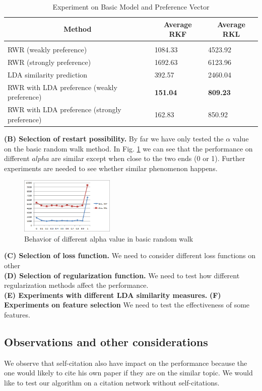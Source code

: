 \documentclass{article} %
\begin{document}
\begin{table}[t]
\caption{Experiment on Basic Model and Preference Vector}
\label{results-table}
\begin{center}
\begin{tabular}{lll}
\multicolumn{1}{c}{\bf Method}  &\multicolumn{1}{c}{\bf Average RKF} &\multicolumn{1}{c}{\bf Average RKL}
\\ \hline \\
RWR (weakly preference) &1084.33 &4523.92\\
RWR (strongly preference) &1692.63 &6123.96\\
LDA similarity prediction &392.57 &2460.04\\
RWR with LDA preference (weakly preference) &\textbf{151.04} &\textbf{809.23}\\
RWR with LDA preference (strongly preference) &162.83 &850.92\\
\end{tabular}
\end{center}
\end{table}
\textbf{(B) Selection of restart possibility.}
By far we have only tested the $\alpha$ value on the basic random walk method. In Fig. \ref{fig:evalAlpha} we can see that the performance on different $alpha$ are similar except when close to the two ends (0 or 1). Further experiments are needed to see whether similar phenomenon happens.\\ 
\begin{figure}[htb]
\centering
\includegraphics[width=0.4\textwidth]{evalAlpha}
\caption{Behavior of different alpha value in basic random walk}
\label{fig:evalAlpha}
\end{figure}
\textbf{(C) Selection of loss function.}
We need to consider different loss functions on other \\
\textbf{(D) Selection of regularization function.}
We need to test how different regularization methods affect the performance.\\
\textbf{(E) Experiments with different LDA similarity measures.}
\textbf{(F) Experiments on feature selection}
We need to test the effectiveness of some features.
\subsection{Observations and other considerations}
We observe that self-citation also have impact on the performance because the one would likely to cite his own paper if they are on the similar topic. We would like to test our algorithm on a citation network without self-citations.
\end{document}
